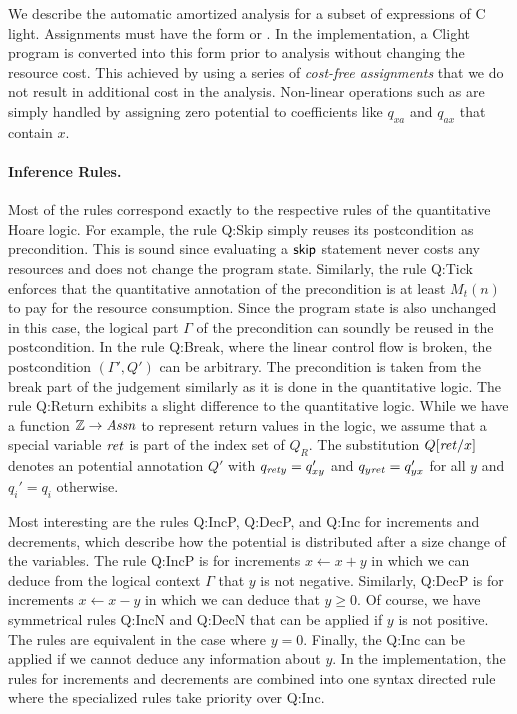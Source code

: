 \documentclass[nocopyrightspace,preprint]{sigplanconf}
\begin{document}
We describe the automatic amortized analysis for a subset of
expressions of C light.  Assignments must have the form  or .  In the implementation, a Clight
program is converted into this form prior to analysis without changing
the resource cost.  This achieved by using a series of \emph{cost-free
  assignments} that we do not result in additional cost in the
analysis.  Non-linear operations such as  are simply
handled by assigning zero potential to coefficients like $q_{xa}$ and
$q_{ax}$ that contain $x$.

\paragraph{Inference Rules.}

Most of the rules correspond exactly to the respective rules of the
quantitative Hoare logic.  For example, the rule {\sc Q:Skip} simply
reuses its postcondition as precondition.  This is sound since
evaluating a $\mathsf{skip}$ statement never costs any resources and
does not change the program state.  Similarly, the rule {\sc Q:Tick}
enforces that the quantitative annotation of the precondition is at
least $M_t(n)$ to pay for the resource consumption.  Since the program
state is also unchanged in this case, the logical part $\Gamma$ of the
precondition can soundly be reused in the postcondition.  In the rule
{\sc Q:Break}, where the linear control flow is broken, the
postcondition $(\Gamma', Q')$ can be arbitrary.  The precondition is
taken from the break part of the judgement similarly as it is done in
the quantitative logic.  The rule {\sc Q:Return} exhibits a slight
difference to the quantitative logic.  While we have a function $\mathbb{Z}
\to \mathit{Assn}$ to represent return values in the logic, we assume that a
special variable $\mathit{ret}$ is part of the index set of $Q_R$.  The
substitution $Q[\mathit{ret}/x]$ denotes an potential annotation $Q'$ with
$q_{\mathit{ret} y} = q'_{x y}$ and $q_{y \mathit{ret}} = q'_{y x}$ for all $y$ and
$q_i'=q_i$ otherwise.

Most interesting are the rules {\sc Q:IncP}, {\sc Q:DecP}, and {\sc
  Q:Inc} for increments and decrements, which describe how the
potential is distributed after a size change of the variables.  The
rule {\sc Q:IncP} is for increments $x \gets x + y$ in which we can
deduce from the logical context $\Gamma$ that $y$ is not negative.
Similarly, {\sc Q:DecP} is for increments $x \gets x - y$ in which we
can deduce that $y \ge 0$.  Of course, we have symmetrical rules {\sc
  Q:IncN} and {\sc Q:DecN} that can be applied if $y$ is not positive.
The rules are equivalent in the case where $y=0$.  Finally, the {\sc
  Q:Inc} can be applied if we cannot deduce any information about $y$.
In the implementation, the rules for increments and decrements are
combined into one syntax directed rule where the specialized rules
take priority over {\sc Q:Inc}.
\end{document}
